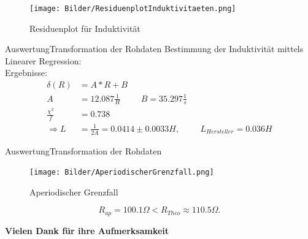 \documentclass[11pt]{beamer}
\begin{document}
\begin{frame}
\begin{figure}[H]
 \caption{Residuenplot für Induktivität}
 \centering
 \texttt{[image: Bilder/ResiduenplotInduktivitaeten.png]}
\end{figure}
\end{frame}

\begin{frame}{Auswertung}{Transformation der Rohdaten}
Bestimmung der Induktivität mittels Linearer Regression: \\
Ergebnisse:
\begin{align*}
\delta(R) &= A*R+B \\
A&=12.087 \frac{1}{H} \hspace{1cm} B=35.297 \frac{1}{s} \\
\frac{\chi^2}{f}&=0.738 \\
\Rightarrow L&=\frac{1}{2A}=0.0414 \pm 0.0033 H, \hspace{1cm} L_{Hersteller}=0.036 H
\end{align*}
\end{frame}

\begin{frame}{Auswertung}{Transformation der Rohdaten}
\begin{figure}[H]
\caption{Aperiodischer Grenzfall}
\centering
\texttt{[image: Bilder/AperiodischerGrenzfall.png]}
\label{Aperiodisch_Bild}
\end{figure}
\begin{equation}
R_{ap}=100.1\Omega < R_{Theo}\approx 110.5\Omega.
\end{equation}
\end{frame}



\begin{frame}
\textbf{Vielen Dank für ihre Aufmerksamkeit}\centering
\end{frame}
\end{document}
